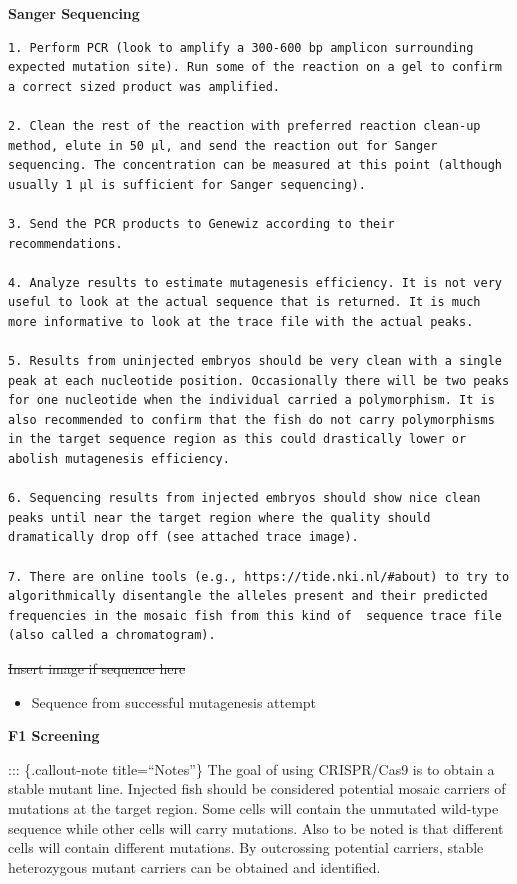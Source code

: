 \documentclass[
  letterpaper,
  DIV=11,
  numbers=noendperiod]{scrreprt}
\providecommand{\tightlist}{%
  \setlength{\itemsep}{0pt}\setlength{\parskip}{0pt}}\usepackage{longtable,booktabs,array}
\begin{document}
\textbf{Sanger Sequencing}

\begin{verbatim}
1. Perform PCR (look to amplify a 300-600 bp amplicon surrounding expected mutation site). Run some of the reaction on a gel to confirm a correct sized product was amplified. 

2. Clean the rest of the reaction with preferred reaction clean-up method, elute in 50 µl, and send the reaction out for Sanger sequencing. The concentration can be measured at this point (although usually 1 µl is sufficient for Sanger sequencing).     

3. Send the PCR products to Genewiz according to their recommendations. 

4. Analyze results to estimate mutagenesis efficiency. It is not very useful to look at the actual sequence that is returned. It is much more informative to look at the trace file with the actual peaks. 

5. Results from uninjected embryos should be very clean with a single peak at each nucleotide position. Occasionally there will be two peaks for one nucleotide when the individual carried a polymorphism. It is also recommended to confirm that the fish do not carry polymorphisms in the target sequence region as this could drastically lower or abolish mutagenesis efficiency. 

6. Sequencing results from injected embryos should show nice clean peaks until near the target region where the quality should dramatically drop off (see attached trace image). 

7. There are online tools (e.g., https://tide.nki.nl/#about) to try to algorithmically disentangle the alleles present and their predicted frequencies in the mosaic fish from this kind of  sequence trace file (also called a chromatogram). 
\end{verbatim}

\st{Insert image if sequence here}

\begin{itemize}
\tightlist
\item
  Sequence from successful mutagenesis attempt
\end{itemize}

\textbf{F1 Screening}

::: \{.callout-note title=``Notes''\} The goal of using CRISPR/Cas9 is
to obtain a stable mutant line. Injected fish should be considered
potential mosaic carriers of mutations at the target region. Some cells
will contain the unmutated wild-type sequence while other cells will
carry mutations. Also to be noted is that different cells will contain
different mutations. By outcrossing potential carriers, stable
heterozygous mutant carriers can be obtained and identified.
\end{document}
